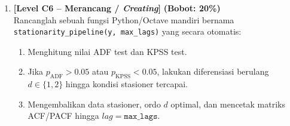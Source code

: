 \documentclass[11pt,a4paper]{article}
\begin{document}
\begin{enumerate}[leftmargin=1.5em, label=\textbf{Soal \arabic*.}]
    \vspace{0.4cm}

    \item \textbf{[Level C6 -- Merancang / \textit{Creating}]} \hfill \textbf{(Bobot: 20\%)} \\
    Rancanglah sebuah fungsi Python/Octave mandiri bernama \texttt{stationarity\_pipeline(y, max\_lags)} yang secara otomatis:
    \begin{enumerate}[label=\alph*.]
        \item Menghitung nilai ADF test dan KPSS test.
        \item Jika $p_{\text{ADF}} > 0.05$ atau $p_{\text{KPSS}} < 0.05$, lakukan diferensiasi berulang $d \in \{1, 2\}$ hingga kondisi stasioner tercapai.
        \item Mengembalikan data stasioner, ordo $d$ optimal, dan mencetak matriks ACF/PACF hingga $lag = \texttt{max\_lags}$.
    \end{enumerate}

\end{enumerate}
\end{document}
